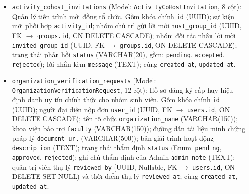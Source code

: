 \begin{enumerate}
\begin{itemize}
        \item \texttt{activity\_cohost\_invitations} (Model: \texttt{ActivityCoHostInvitation}, 8 cột): Quản lý tiến trình mời đồng tổ chức. Gồm khóa chính \texttt{id} (UUID); sự kiện mời phối hợp \texttt{activity\_id}; nhóm chủ trì gửi lời mời \texttt{host\_group\_id} (UUID, FK $\rightarrow$ \texttt{groups.id}, ON DELETE CASCADE); nhóm đối tác nhận lời mời \texttt{invited\_group\_id} (UUID, FK $\rightarrow$ \texttt{groups.id}, ON DELETE CASCADE); trạng thái phản hồi \texttt{status} (VARCHAR(20), gồm: \texttt{pending}, \texttt{accepted}, \texttt{rejected}); lời nhắn kèm \texttt{message} (TEXT); cùng \texttt{created\_at}, \texttt{updated\_at}.
        \item \texttt{organization\_verification\_requests} (Model: \texttt{OrganizationVerificationRequest}, 12 cột): Hồ sơ đăng ký cấp huy hiệu định danh uy tín chính thức cho nhóm sinh viên. Gồm khóa chính \texttt{id} (UUID); người đại diện nộp đơn \texttt{user\_id} (UUID, FK $\rightarrow$ \texttt{users.id}, ON DELETE CASCADE); tên tổ chức \texttt{organization\_name} (VARCHAR(150)); khoa viện bảo trợ \texttt{faculty} (VARCHAR(150)); đường dẫn tài liệu minh chứng pháp lý \texttt{document\_url} (VARCHAR(500)); bản giải trình hoạt động \texttt{description} (TEXT); trạng thái thẩm định \texttt{status} (Enum: \texttt{pending}, \texttt{approved}, \texttt{rejected}); ghi chú thẩm định của Admin \texttt{admin\_note} (TEXT); quản trị viên thụ lý \texttt{reviewed\_by} (UUID, Nullable, FK $\rightarrow$ \texttt{users.id}, ON DELETE SET NULL) và thời điểm thụ lý \texttt{reviewed\_at}; cùng \texttt{created\_at}, \texttt{updated\_at}.
    \end{itemize}


\end{enumerate}
